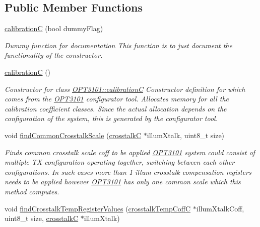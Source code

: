 \subsection*{Public Member Functions}
\begin{DoxyCompactItemize}
\item 
\mbox{\hyperlink{class_o_p_t3101_1_1calibration_c_a84e3f1b924cf7f677977e36663ddad7a}{calibrationC}} (bool dummy\+Flag)
\begin{DoxyCompactList}\small\item\em Dummy function for documentation This function is to just document the functionality of the constructor. \end{DoxyCompactList}\item 
\mbox{\hyperlink{class_o_p_t3101_1_1calibration_c_adaa42643a7b88087e4909f7017a85ef4}{calibrationC}} ()
\begin{DoxyCompactList}\small\item\em Constructor for class \mbox{\hyperlink{class_o_p_t3101_1_1calibration_c}{O\+P\+T3101\+::calibrationC}} Constructor definition for which comes from the \mbox{\hyperlink{namespace_o_p_t3101}{O\+P\+T3101}} configurator tool. Allocates memory for all the calibration coefficient classes. Since the actual allocation depends on the configuration of the system, this is generated by the configurator tool. \end{DoxyCompactList}\item 
void \mbox{\hyperlink{class_o_p_t3101_1_1calibration_c_ae2c3f2786e65315d817b8953380e33b6}{find\+Common\+Crosstalk\+Scale}} (\mbox{\hyperlink{class_o_p_t3101_1_1crosstalk_c}{crosstalkC}} $\ast$illum\+Xtalk, uint8\+\_\+t size)
\begin{DoxyCompactList}\small\item\em Finds common crosstalk scale coff to be applied \mbox{\hyperlink{namespace_o_p_t3101}{O\+P\+T3101}} system could consist of multiple TX configuration operating together, switching between each other configurations. In such cases more than 1 illum crosstalk compensation registers needs to be applied however \mbox{\hyperlink{namespace_o_p_t3101}{O\+P\+T3101}} has only one common scale which this method computes. \end{DoxyCompactList}\item 
void \mbox{\hyperlink{class_o_p_t3101_1_1calibration_c_ac133c41d60c71559a224a86bc3e62c3a}{find\+Crosstalk\+Temp\+Register\+Values}} (\mbox{\hyperlink{class_o_p_t3101_1_1crosstalk_temp_coff_c}{crosstalk\+Temp\+CoffC}} $\ast$illum\+Xtalk\+Coff, uint8\+\_\+t size, \mbox{\hyperlink{class_o_p_t3101_1_1crosstalk_c}{crosstalkC}} $\ast$illum\+Xtalk)

\end{DoxyCompactItemize}
